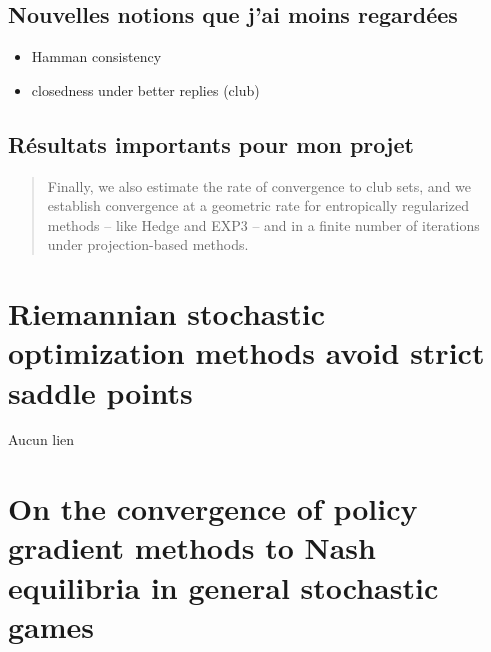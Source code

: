 \documentclass{article}
\begin{document}
\subsection{Nouvelles notions que j'ai moins regardées}
\begin{itemize}
    \item Hamman consistency
    \item closedness under better replies (club)
\end{itemize}

\subsection{Résultats importants pour mon projet}
\begin{quote}
    Finally, we also estimate the rate of convergence to club sets, and we establish convergence at a geometric rate for entropically regularized methods – like Hedge and EXP3 – and in a finite number of iterations under projection-based methods.
\end{quote}

\section{Riemannian stochastic optimization methods avoid strict saddle points \cite{hsieh_riemannian_2023}}
Aucun lien

\section{On the convergence of policy gradient methods to Nash equilibria in general stochastic games \cite{giannou_convergence_2022}}
\end{document}
